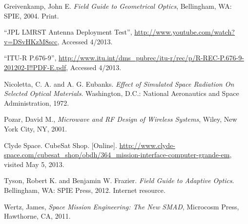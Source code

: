 \documentclass[12pt]{article}
\begin{document}
\begin{thebibliography}{9}
   Greivenkamp, John E. 
   \emph{Field Guide to Geometrical Optics}, Bellingham, WA: SPIE, 2004. Print.

``JPL LMRST Antenna Deployment Test'', \url{http://www.youtube.com/watch?v=DSvHKzM8scc}, Accessed 4/2013.

``ITU-R P.676-9'', \url{http://www.itu.int/dms_pubrec/itu-r/rec/p/R-REC-P.676-9-201202-I!!PDF-E.pdf}, Accessed 4/2013.

   Nicoletta, C. A. and A. G. Eubanks.
   \emph{Effect of Simulated Space Radiation On Selected Optical Materials}. Washington, D.C.: National Aeronautics and Space Administration, 1972.

Pozar, David M., \emph{Microwave and RF Design of Wireless Systems}, Wiley, New York City, NY, 2001.



Clyde Space. CubeSat Shop. [Online]. \url{http://www.clyde-space.com/cubesat_shop/obdh/364_mission-interface-computer-grande-em}, visited May 5, 2013. 






   Tyson, Robert K. and Benjamin W. Frazier. 
   \emph{Field Guide to Adaptive Optics}. Bellingham, WA: SPIE Press, 2012.  Internet resource.

Wertz, James, \emph{Space Mission Engineering: The New SMAD}, Microcosm Press, Hawthorne, CA, 2011.


\end{thebibliography}
\end{document}
